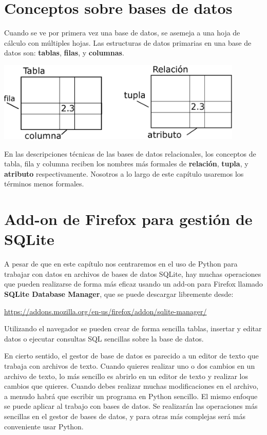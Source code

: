 \section{Conceptos sobre bases de datos}

Cuando se ve por primera vez una base de datos, se asemeja a una
hoja de cálculo con múltiples hojas. Las estructuras de datos primarias
en una base de datos son:
{\bf tablas}, {\bf filas}, y {\bf columnas}.  

\beforefig
\centerline{\includegraphics[height=1.50in]{figs2/relational.eps}}
\afterfig

En las descripciones técnicas de las bases de datos relacionales, los conceptos de
tabla, fila y columna reciben los nombres más formales
de {\bf relación}, {\bf tupla}, y {\bf atributo} respectivamente.
Nosotros a lo largo de este capítulo usaremos los términos menos formales.

\section{Add-on de Firefox para gestión de SQLite}

A pesar de que en este capítulo nos centraremos en el uso de Python para trabajar con datos
en archivos de bases de datos SQLite, hay muchas operaciones que pueden realizarse
de forma más eficaz usando un add-on para Firefox llamado {\bf SQLite
Database Manager}, que se puede descargar libremente desde:

\url{https://addons.mozilla.org/en-us/firefox/addon/sqlite-manager/}

Utilizando el navegador se pueden crear de forma sencilla tablas, insertar y editar datos
o ejecutar consultas SQL sencillas sobre la base de datos.

En cierto sentido, el gestor de base de datos es parecido a un editor de texto
que trabaja con archivos de texto. Cuando quieres realizar uno o
dos cambios en un archivo de texto, lo más sencillo es abrirlo en
un editor de texto y realizar los cambios que quieres. Cuando debes realizar
muchas modificaciones en el archivo, a menudo
habrá que escribir un programa en Python sencillo. El mismo enfoque
se puede aplicar al trabajo con bases de datos. Se realizarán las
operaciones más sencillas en el gestor de bases de datos, y para otras más complejas
será más conveniente usar Python.

